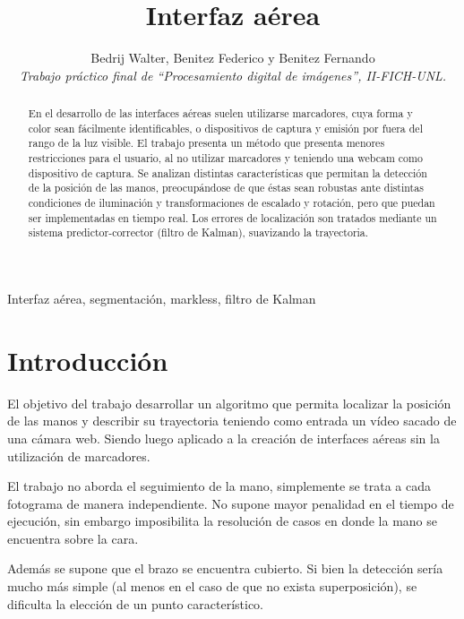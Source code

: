 \documentclass[conference,a4paper,10pt,oneside,final]{tfmpd}
\begin{document}
	\title{Interfaz aérea}
	\author{Bedrij Walter, Benitez Federico y Benitez Fernando \\
	\textit{Trabajo práctico final de ``Procesamiento digital de imágenes'', II-FICH-UNL.}}
	\date{}

	\maketitle

\begin{abstract}
	En el desarrollo de las interfaces aéreas suelen utilizarse marcadores, 
	cuya forma y color sean fácilmente identificables, o dispositivos 
	de captura y emisión por fuera del rango de la luz visible.
	El trabajo presenta un método que presenta menores restricciones para el usuario, al no utilizar marcadores y teniendo una webcam como dispositivo de captura. 
	Se analizan distintas características que permitan la detección de la posición de las manos, preocupándose de que éstas sean robustas ante distintas condiciones de iluminación y transformaciones de escalado y rotación, pero que puedan ser implementadas en tiempo real.
	Los errores de localización son tratados mediante un sistema predictor-corrector (filtro de Kalman), suavizando la trayectoria. 
\end{abstract}
	\begin{keywords}
   		 Interfaz aérea, segmentación, markless, filtro de Kalman
	\end{keywords}

    \section{Introducción}
	El objetivo del trabajo desarrollar un algoritmo que permita localizar la posición de las manos y describir su trayectoria teniendo como entrada un vídeo sacado de una cámara web.
	Siendo luego aplicado a la creación de interfaces aéreas sin la utilización de marcadores.

	El trabajo no aborda el seguimiento de la mano, simplemente se trata a cada fotograma de manera independiente. 
No supone mayor penalidad en  el tiempo de ejecución, 
sin embargo imposibilita la resolución de casos en donde
la mano se encuentra sobre la cara.

Además se supone que el brazo se encuentra cubierto. 
Si bien la detección sería mucho más simple (al menos en el caso de que no exista superposición), se dificulta la elección de un punto característico.
\end{document}
